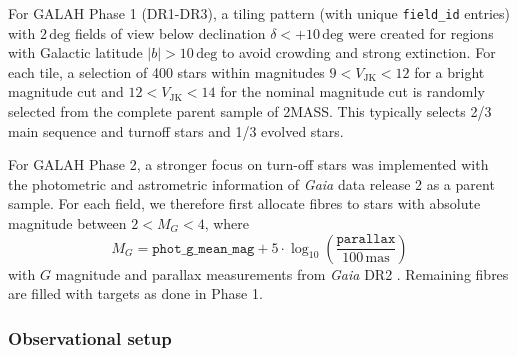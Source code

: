 \documentclass[
  journal=pasa,
  manuscript=research-paper, %
  year=2024,
  volume=37
]{cup-journal}
\newcommand{\Gaia}{\textit{Gaia}\xspace}
\begin{document}
For GALAH Phase 1 (DR1-DR3), a tiling pattern (with unique \texttt{field\_id} entries) with $2\,\mathrm{deg}$ fields of view below declination $\delta < +10\,\mathrm{deg}$ were created for regions with Galactic latitude $\vert b \vert > 10\,\mathrm{deg}$ to avoid crowding and strong extinction. For each tile, a selection of 400 stars within magnitudes $9 < V_\mathrm{JK} < 12$ for a bright magnitude cut and $12 < V_\mathrm{JK} < 14$ for the nominal magnitude cut is randomly selected from the complete parent sample of 2MASS. This typically selects 2/3 main sequence and turnoff stars and 1/3 evolved stars.

For GALAH Phase 2, a stronger focus on turn-off stars was implemented with the photometric and astrometric information of \Gaia data release 2 as a parent sample. For each field, we therefore first allocate fibres to stars with absolute magnitude between $2 < M_G < 4$, where
\begin{equation}
M_G = \texttt{phot\_g\_mean\_mag} + 5 \cdot \log_{10} \left( \frac{\texttt{parallax}}{100\,\mathrm{mas}} \right)
\end{equation}
with $G$ magnitude and parallax measurements from \Gaia DR2 \citep{Brown2018, Evans2018, Lindegren2018}. Remaining fibres are filled with targets as done in Phase 1.

\subsubsection{Observational setup}
\end{document}
